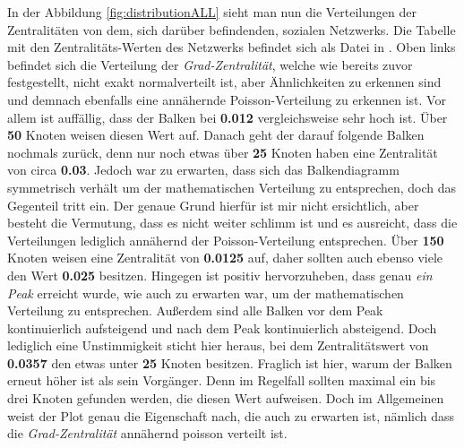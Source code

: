 In der Abbildung \ref{fig:distributionALL} sieht man nun die Verteilungen der Zentralitäten von dem, sich darüber befindenden, sozialen Netzwerks. Die Tabelle mit den Zentralitäts-Werten des Netzwerks befindet sich als Datei in \cite{TZ}. Oben links befindet sich die Verteilung der \textit{Grad-Zentralität}, welche wie bereits zuvor festgestellt, nicht exakt normalverteilt ist, aber Ähnlichkeiten zu erkennen sind und demnach ebenfalls eine annähernde Poisson-Verteilung zu erkennen ist. Vor allem ist auffällig, dass der Balken bei \textbf{0.012} vergleichsweise sehr hoch ist. Über \textbf{50} Knoten weisen diesen Wert auf. Danach geht der darauf folgende Balken nochmals zurück, denn nur noch etwas über \textbf{25} Knoten haben eine Zentralität von circa \textbf{0.03}. Jedoch war zu erwarten, dass sich das Balkendiagramm symmetrisch verhält um der mathematischen Verteilung zu entsprechen, doch das Gegenteil tritt ein. Der genaue Grund hierfür ist mir nicht ersichtlich, aber besteht die Vermutung, dass es nicht weiter schlimm ist und es ausreicht, dass die Verteilungen lediglich annähernd der Poisson-Verteilung entsprechen. Über \textbf{150} Knoten weisen eine Zentralität von \textbf{0.0125} auf, daher sollten auch ebenso viele den Wert \textbf{0.025} besitzen. Hingegen ist positiv hervorzuheben, dass genau \textit{ein Peak} erreicht wurde, wie auch zu erwarten war, um der mathematischen Verteilung zu entsprechen. Außerdem sind alle Balken vor dem Peak kontinuierlich aufsteigend und nach dem Peak kontinuierlich absteigend. Doch lediglich eine Unstimmigkeit sticht hier heraus, bei dem Zentralitätswert von \textbf{0.0357} den etwas unter \textbf{25} Knoten besitzen. Fraglich ist hier, warum der Balken erneut höher ist als sein Vorgänger. Denn im Regelfall sollten maximal ein bis drei Knoten gefunden werden, die diesen Wert aufweisen. Doch im Allgemeinen weist der Plot genau die Eigenschaft nach, die auch zu erwarten ist, nämlich dass die \textit{Grad-Zentralität} annähernd poisson verteilt ist.\\


